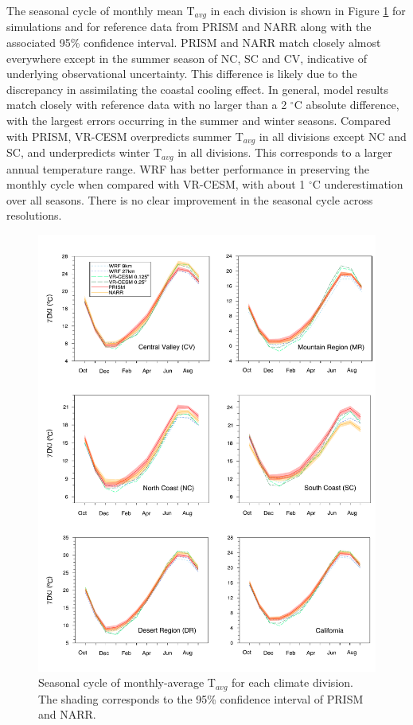 The seasonal cycle of monthly mean T$_{avg}$ in each division is shown in Figure \ref{fig:Figure 6} for simulations and for reference data from PRISM and NARR along with the associated 95\% confidence interval. PRISM and NARR match closely almost everywhere except in the summer season of NC, SC and CV, indicative of underlying observational uncertainty. This difference is likely due to the discrepancy in assimilating the coastal cooling effect.  In general, model results match closely with reference data with no larger than a 2 $^\circ$C absolute difference, with the largest errors occurring in the summer and winter seasons.  Compared with PRISM, VR-CESM overpredicts summer T$_{avg}$ in all divisions except NC and SC, and underpredicts winter T$_{avg}$ in all divisions.  This corresponds to a larger annual temperature range. WRF has better performance in preserving the monthly cycle when compared with VR-CESM, with about 1 $^\circ$C underestimation over all seasons. There is no clear improvement in the seasonal cycle across resolutions.

\begin{figure}
\begin{center}
\includegraphics[width=6in]{trd_t2avg_allzones.pdf}
\end{center}
\caption{Seasonal cycle of monthly-average T$_{avg}$ for each climate division. The shading corresponds to the 95\% confidence interval of PRISM and NARR. } \label{fig:Figure 6}
\end{figure}

